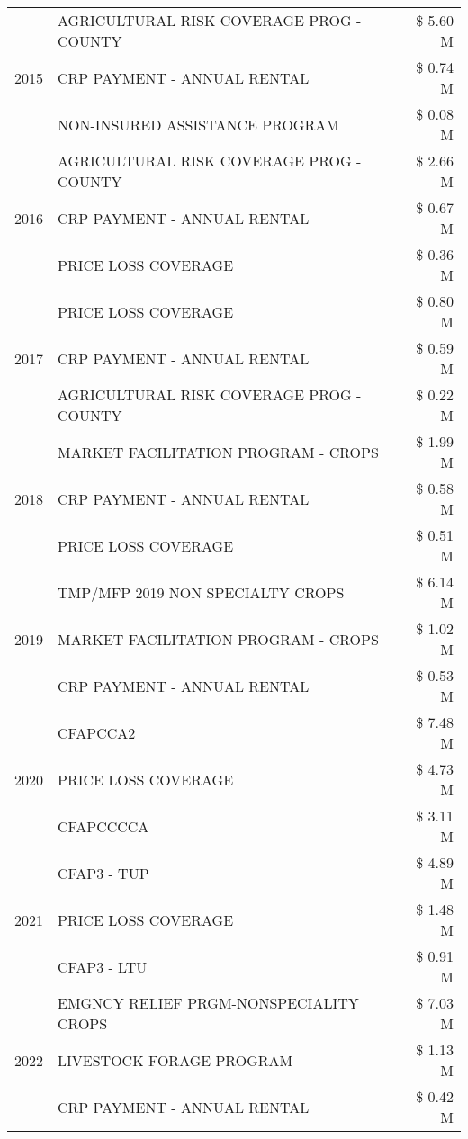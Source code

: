 \begin{tabular}{llr}
\cline{1-3}
\multirow[t]{3}{*}{2015} & AGRICULTURAL RISK COVERAGE PROG - COUNTY & \$ 5.60 M \\
 & CRP PAYMENT - ANNUAL RENTAL & \$ 0.74 M \\
 & NON-INSURED ASSISTANCE PROGRAM & \$ 0.08 M \\
\cline{1-3}
\multirow[t]{3}{*}{2016} & AGRICULTURAL RISK COVERAGE PROG - COUNTY & \$ 2.66 M \\
 & CRP PAYMENT - ANNUAL RENTAL & \$ 0.67 M \\
 & PRICE LOSS COVERAGE & \$ 0.36 M \\
\cline{1-3}
\multirow[t]{3}{*}{2017} & PRICE LOSS COVERAGE & \$ 0.80 M \\
 & CRP PAYMENT - ANNUAL RENTAL & \$ 0.59 M \\
 & AGRICULTURAL RISK COVERAGE PROG - COUNTY & \$ 0.22 M \\
\cline{1-3}
\multirow[t]{3}{*}{2018} & MARKET FACILITATION PROGRAM - CROPS & \$ 1.99 M \\
 & CRP PAYMENT - ANNUAL RENTAL & \$ 0.58 M \\
 & PRICE LOSS COVERAGE & \$ 0.51 M \\
\cline{1-3}
\multirow[t]{3}{*}{2019} & TMP/MFP 2019 NON SPECIALTY CROPS & \$ 6.14 M \\
 & MARKET FACILITATION PROGRAM - CROPS & \$ 1.02 M \\
 & CRP PAYMENT - ANNUAL RENTAL & \$ 0.53 M \\
\cline{1-3}
\multirow[t]{3}{*}{2020} & CFAPCCA2 & \$ 7.48 M \\
 & PRICE LOSS COVERAGE & \$ 4.73 M \\
 & CFAPCCCCA & \$ 3.11 M \\
\cline{1-3}
\multirow[t]{3}{*}{2021} & CFAP3 - TUP & \$ 4.89 M \\
 & PRICE LOSS COVERAGE & \$ 1.48 M \\
 & CFAP3 - LTU & \$ 0.91 M \\
\cline{1-3}
\multirow[t]{3}{*}{2022} & EMGNCY RELIEF PRGM-NONSPECIALITY CROPS & \$ 7.03 M \\
 & LIVESTOCK FORAGE PROGRAM & \$ 1.13 M \\
 & CRP PAYMENT - ANNUAL RENTAL & \$ 0.42 M \\
\cline{1-3}
\bottomrule
\end{tabular}
